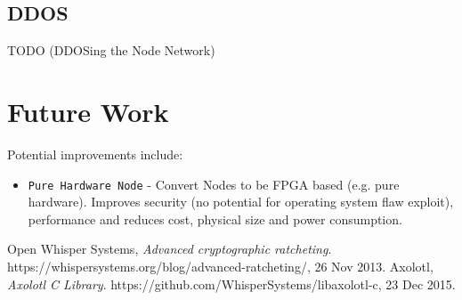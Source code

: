 \documentclass{article}
\begin{document}
\newpage

\subsection{DDOS}
TODO (DDOSing the Node Network)

\section{Future Work}
Potential improvements include:
\begin{itemize}
	\item \texttt{Pure Hardware Node} - Convert Nodes to be FPGA based (e.g. pure hardware). Improves security (no potential for operating system flaw exploit), performance and reduces cost, physical size and power consumption.
\end{itemize}

\newpage

\begin{thebibliography}{9}
	 Open Whisper Systems, \emph{Advanced cryptographic ratcheting}. https://whispersystems.org/blog/advanced-ratcheting/, 26 Nov 2013.
	 Axolotl, \emph{ Axolotl C Library}. https://github.com/WhisperSystems/libaxolotl-c, 23 Dec 2015.

\end{thebibliography}
\end{document}
